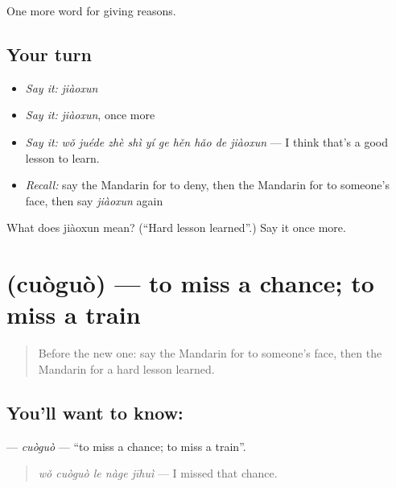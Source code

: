 \begin{grammarlens}[title={What you've built}]
One more word for giving reasons.
\end{grammarlens}

\subsection*{Your turn}
\begin{itemize}
\raggedright
  \item \emph{Say it:} \emph{jiàoxun}
  \item \emph{Say it:} \emph{jiàoxun}, once more
  \item \emph{Say it:} \emph{wǒ juéde zhè shì yí ge hěn hǎo de jiàoxun} — I think that's a good lesson to learn.
  \item \emph{Recall:} say the Mandarin for to deny, then the Mandarin for to someone's face, then say \emph{jiàoxun} again
\end{itemize}

\begin{tcolorbox}[breakable,colback=teal!4,colframe=teal!35!black,title={Before you move on}]
What does jiàoxun mean? (\textquotedblleft{}Hard lesson learned\textquotedblright{}.) Say it once more.
\end{tcolorbox}
\section[\texorpdfstring{\zh{错过} (cuòguò)}{错过 (cuòguò)}]{ (cuòguò) — to miss a chance; to miss a train}

\label{lesson:ZH-C356-cuoguo}



\begin{quote}
Before the new one: say the Mandarin for to someone's face, then the Mandarin for a hard lesson learned.
\end{quote}

\subsection*{You'll want to know: }
\textbf{} — \emph{cuòguò} — \textquotedblleft{}to miss a chance; to miss a train\textquotedblright{}.

\begin{quote}
\textbf{} \emph{wǒ cuòguò le nàge jīhuì} — I missed that chance.
\end{quote}

